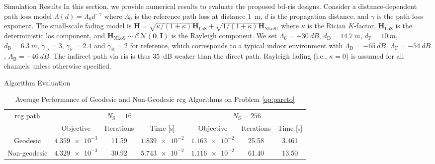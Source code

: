 \begin{section}{Simulation Results}\label{sc:simulation}
	In this section, we provide numerical results to evaluate the proposed \gls{bd}-\gls{ris} designs.
	Consider a distance-dependent path loss model $\Lambda(d) = \Lambda_0 d^{-\gamma}$ where $\Lambda_0$ is the reference path loss at distance \qty{1}{m}, $d$ is the propagation distance, and $\gamma$ is the path loss exponent.
	The small-scale fading model is $\mathbf{H} = \sqrt{\kappa/(1+\kappa)} \mathbf{H}_\text{LoS} + \sqrt{1/(1+\kappa)} \mathbf{H}_\text{NLoS}$, where $\kappa$ is the Rician $K$-factor, $\mathbf{H}_\text{LoS}$ is the deterministic \gls{los} component, and $\mathbf{H}_\text{NLoS} \sim \mathcal{CN}(\mathbf{0}, \mathbf{I})$ is the Rayleigh component.
	We set $\Lambda_0=\qty{-30}{dB}$, $d_\mathrm{D}=\qty{14.7}{m}$, $d_\mathrm{F}=\qty{10}{m}$, $d_\mathrm{B}=\qty{6.3}{m}$, $\gamma_\mathrm{D}=3$, $\gamma_\mathrm{F}=2.4$ and $\gamma_\mathrm{B}=2$ for reference, which corresponds to a typical indoor environment with $\Lambda_\mathrm{D}=\qty{-65}{dB}$, $\Lambda_\mathrm{F}=\qty{-54}{dB}$, $\Lambda_\mathrm{B}=\qty{-46}{dB}$.
	The indirect path via \gls{ris} is thus \qty{35}{\dB} weaker than the direct path.
	Rayleigh fading (i.e., $\kappa = 0$) is assumed for all channels unless otherwise specified.

	\begin{subsection}{Algorithm Evaluation}
		\begin{table}[H]
			\footnotesize
			\caption{Average Performance of Geodesic and Non-Geodesic \gls{rcg} Algorithms on Problem \eqref{op:pareto}}
			\label{tb:complexity_test}
			\centering
			\begin{tabular}{ccccccc}
				\toprule
				\multirow{2}{*}{\gls{rcg} path} & \multicolumn{3}{c}{$N_\mathrm{S}=16$} & \multicolumn{3}{c}{$N_\mathrm{S}=256$}                                                               \\ \cmidrule(lr){2-4} \cmidrule(lr){5-7}
												& Objective                             & Iterations                             & Time [s]         & Objective        & Iterations & Time [s] \\ \midrule
				Geodesic                        & $\num{4.359e-3}$                      & 11.59                                  & $\num{1.839e-2}$ & $\num{1.163e-2}$ & 25.58      & 3.461    \\
				Non-geodesic                    & $\num{4.329e-3}$                      & 30.92                                  & $\num{5.743e-2}$ & $\num{1.116e-2}$ & 61.40      & 13.50    \\ \bottomrule
			\end{tabular}
		\end{table}


\end{subsection}
\end{section}
